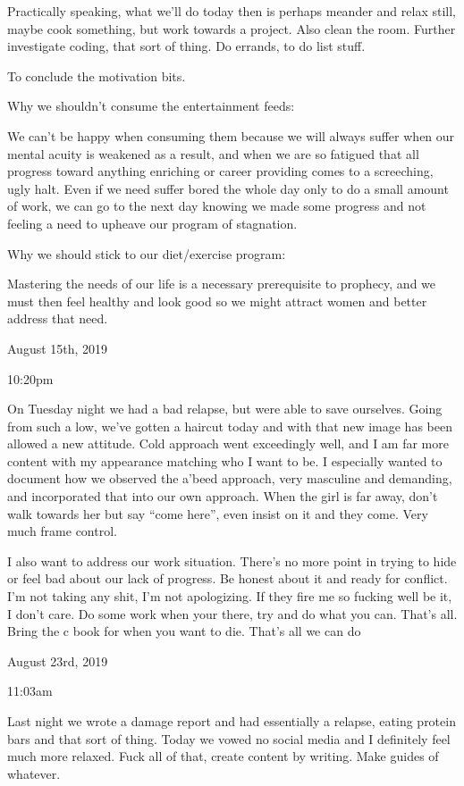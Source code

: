 Practically speaking, what we'll do today then is perhaps meander and
relax still, maybe cook something, but work towards a project. Also
clean the room. Further investigate coding, that sort of thing. Do
errands, to do list stuff.

To conclude the motivation bits.

Why we shouldn't consume the entertainment feeds:

We can't be happy when consuming them because we will always suffer when
our mental acuity is weakened as a result, and when we are so fatigued
that all progress toward anything enriching or career providing comes to
a screeching, ugly halt. Even if we need suffer bored the whole day only
to do a small amount of work, we can go to the next day knowing we made
some progress and not feeling a need to upheave our program of
stagnation.

Why we should stick to our diet/exercise program:

Mastering the needs of our life is a necessary prerequisite to prophecy,
and we must then feel healthy and look good so we might attract women
and better address that need.

\bigskip
\bigskip
August 15th, 2019

10:20pm

On Tuesday night we had a bad relapse, but were able to save ourselves.
Going from such a low, we've gotten a haircut today and with that new
image has been allowed a new attitude. Cold approach went exceedingly
well, and I am far more content with my appearance matching who I want
to be. I especially wanted to document how we observed the a'beed
approach, very masculine and demanding, and incorporated that into our
own approach. When the girl is far away, don't walk towards her but say
``come here'', even insist on it and they come. Very much frame control.

I also want to address our work situation. There's no more point in
trying to hide or feel bad about our lack of progress. Be honest about
it and ready for conflict. I'm not taking any shit, I'm not apologizing.
If they fire me so fucking well be it, I don't care. Do some work when
your there, try and do what you can. That's all. Bring the c book for
when you want to die. That's all we can do

\bigskip
\bigskip
August 23rd, 2019

11:03am

Last night we wrote a damage report and had essentially a relapse,
eating protein bars and that sort of thing. Today we vowed no social
media and I definitely feel much more relaxed. Fuck all of that, create
content by writing. Make guides of whatever.

